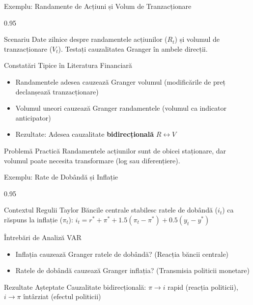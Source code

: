 \documentclass[9pt, aspectratio=169, t]{beamer}
\begin{document}
\begin{frame}{Exemplu: Randamente de Acțiuni și Volum de Tranzacționare}
    \begin{cminipage}{0.95\textwidth}
    {\small
    \begin{block}{Scenariu}
        Date zilnice despre randamentele acțiunilor ($R_t$) și volumul de tranzacționare ($V_t$). Testați cauzalitatea Granger în ambele direcții.
    \end{block}
    \begin{exampleblock}{Constatări Tipice în Literatura Financiară}
        \begin{itemize}\setlength{\itemsep}{0pt}
            \item Randamentele adesea cauzează Granger volumul (modificările de preț declanșează tranzacționare)
            \item Volumul uneori cauzează Granger randamentele (volumul ca indicator anticipator)
            \item Rezultate: Adesea cauzalitate \textbf{bidirecțională} $R \leftrightarrow V$
        \end{itemize}
    \end{exampleblock}
    \begin{block}{Problemă Practică}
        Randamentele acțiunilor sunt de obicei staționare, dar volumul poate necesita transformare (log sau diferențiere).
    \end{block}
    }
    \end{cminipage}
\end{frame}

\begin{frame}{Exemplu: Rate de Dobândă și Inflație}
    \begin{cminipage}{0.95\textwidth}
    {\small
    \begin{block}{Contextul Regulii Taylor}
        Băncile centrale stabilesc ratele de dobândă ($i_t$) ca răspuns la inflație ($\pi_t$):
        $i_t = r^* + \pi^* + 1.5(\pi_t - \pi^*) + 0.5(y_t - y^*)$
    \end{block}
    \begin{exampleblock}{Întrebări de Analiză VAR}
        \begin{itemize}\setlength{\itemsep}{0pt}
            \item Inflația cauzează Granger ratele de dobândă? (Reacția băncii centrale)
            \item Ratele de dobândă cauzează Granger inflația? (Transmisia politicii monetare)
        \end{itemize}
    \end{exampleblock}
    \begin{block}{Rezultate Așteptate}
        Cauzalitate bidirecțională: $\pi \to i$ rapid (reacția politicii), $i \to \pi$ întârziat (efectul politicii)
    \end{block}
    }
    \end{cminipage}
\end{frame}
\end{document}
